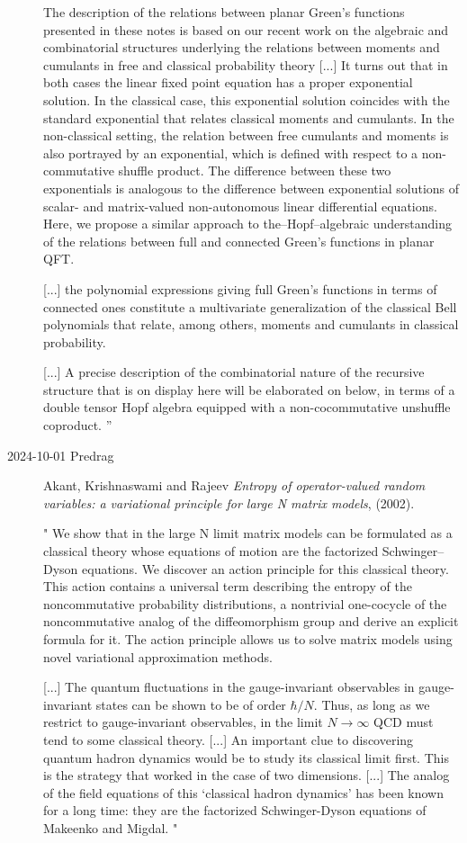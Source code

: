 \begin{description}
The description of the relations between planar Green's functions
presented in these notes is based on our recent work on the algebraic and
combinatorial structures underlying the relations between moments and
cumulants in free and classical probability theory
[...]
It turns out that in both cases the linear fixed point equation has a
proper exponential solution. In the classical case, this exponential
solution coincides with the standard exponential that relates classical
moments and cumulants. In the non-classical setting, the relation between
free cumulants and moments is also portrayed by an exponential, which is
defined with respect to a non-commutative shuffle product. The difference
between these two exponentials is analogous to the difference between
exponential solutions of scalar- and matrix-valued non-autonomous linear
differential equations. Here, we propose a similar approach to
the–Hopf–algebraic understanding of the relations between full and
connected Green's functions in planar QFT.

[...] the polynomial expressions giving full Green's functions in terms
of connected ones constitute a multivariate generalization of the
classical Bell polynomials that relate, among others, moments and
cumulants in classical probability.

[...]  A precise description of the combinatorial nature of the recursive
structure that is on display here will be elaborated on below, in terms
of a double tensor Hopf algebra equipped with a non-cocommutative
unshuffle coproduct.
''



\item[2024-10-01 Predrag]
Akant, Krishnaswami and Rajeev {\em Entropy of 
operator-valued random variables: a variational principle for large {N} 
matrix models}, (2002). 

"
We show that  in the large N limit matrix models can be formulated as a 
classical theory whose equations of motion are the factorized 
Schwinger–Dyson equations. We discover an action principle for this 
classical theory. This action contains a universal term describing the 
entropy of the noncommutative probability distributions, a nontrivial 
one-cocycle of the noncommutative analog of the diffeomorphism group and 
derive an explicit formula for it. The action principle allows us to 
solve matrix models using novel variational approximation methods.

[...]
The quantum fluctuations in the gauge-invariant observables in 
gauge-invariant states can be shown to be of order $\hbar/N$. Thus, as 
long as we restrict to gauge-invariant observables, in the limit 
$N\to\infty$ QCD must tend to some classical theory. 
[...]
An important clue to discovering quantum hadron dynamics would be to 
study its classical limit first. This is the strategy that worked in the 
case of two dimensions. 
[...]
The analog of the field equations of this `classical hadron dynamics' has been
known for a long time: they are the factorized Schwinger-Dyson equations
of Makeenko and  Migdal.
"


\end{description}
